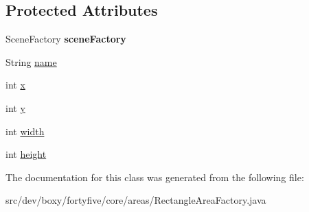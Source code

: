 \subsection*{Protected Attributes}
\begin{DoxyCompactItemize}
\item 
\hypertarget{classdev_1_1boxy_1_1fortyfive_1_1core_1_1areas_1_1_rectangle_area_factory_ab2dc6a4cab961849a83e8eccd314071c}{
SceneFactory {\bfseries sceneFactory}}
\label{d8/d89/classdev_1_1boxy_1_1fortyfive_1_1core_1_1areas_1_1_rectangle_area_factory_ab2dc6a4cab961849a83e8eccd314071c}

\item 
String \hyperlink{group___rectangle_area_gaa9dd1bb57ebf508cd2a50260ef3094cc}{name}
\item 
int \hyperlink{group___rectangle_area_gae77066a4844139558dd4e05beb887764}{x}
\item 
int \hyperlink{group___rectangle_area_ga40b3b0422d96ddc0c318efaeff239cc5}{y}
\item 
int \hyperlink{group___rectangle_area_ga4eef08a509ab1d413d231624d4625eb2}{width}
\item 
int \hyperlink{group___rectangle_area_gaa7b0ba57b53529eb79a8d671cce6e073}{height}
\end{DoxyCompactItemize}


The documentation for this class was generated from the following file:\begin{DoxyCompactItemize}
\item 
src/dev/boxy/fortyfive/core/areas/RectangleAreaFactory.java\end{DoxyCompactItemize}
